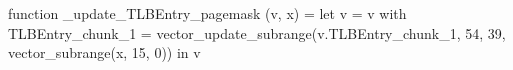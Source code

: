 function _update_TLBEntry_pagemask (v, x) = let v = { v with TLBEntry_chunk_1 = vector_update_subrange(v.TLBEntry_chunk_1, 54, 39, vector_subrange(x, 15, 0)) } in v
